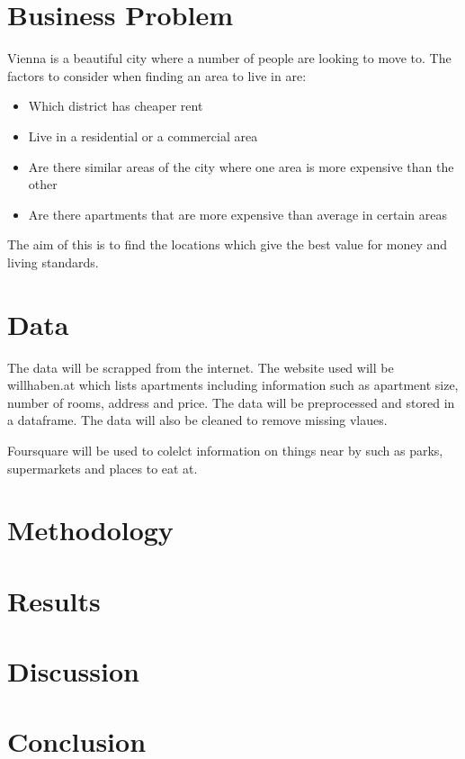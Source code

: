 \documentclass[12pt]{article}
\begin{document}
\maketitle

\section{Business Problem}
Vienna is a beautiful city where a number of people are looking to move to. The factors to consider when finding an area to live in are:

\begin{itemize}
\item Which district has cheaper rent
\item Live in a residential or a commercial area
\item Are there similar areas of the city where one area is more expensive than the other
\item Are there apartments that are more expensive than average in certain areas
\end{itemize}

The aim of this is to find the locations which give the best value for money and living standards.

\section{Data}
The data will be scrapped from the internet. The website used will be willhaben.at which lists apartments including information such as apartment size, number of rooms, address and price. The data will be preprocessed and stored in a dataframe. The data will also be cleaned to remove missing vlaues.

Foursquare will be used to colelct information on things near by such as parks, supermarkets and places to eat at.

\section{Methodology}

\section{Results}

\section{Discussion}

\section{Conclusion}
\end{document}
